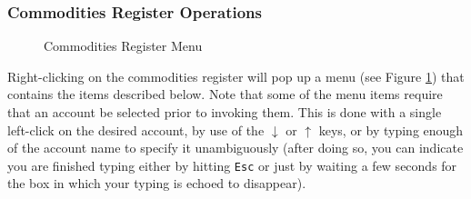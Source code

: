 \documentclass{report}
\newcommand{\graphicsfig}[5]{
\begin{figure}[#5]
\begin{center}
\resizebox{#1}{!}{\texttt{[image: \#2]}}
\end{center}
\caption{#3}
\label{#4}
\end{figure}
}
\begin{document}
\subsubsection{Commodities Register Operations}
\label{Commodities Register Operations}
\graphicsfig{5in}{figures/commodities_register_menu.png}{Commodities Register Menu}{Commodities Register Menu}{}
Right-clicking on the commodities register will pop up a menu (see Figure \ref{Commodities Register Menu}) that contains the items described below. Note that some of the menu items require that an account be selected prior to invoking them. This is done with a single left-click on the desired account, by use of the $\downarrow$ or $\uparrow$ keys, or by typing enough of the account name to specify it unambiguously (after doing so, you can indicate you are finished typing either by hitting \verb|Esc| or just by waiting a few seconds for the box in which your typing is echoed to disappear).
\end{document}
